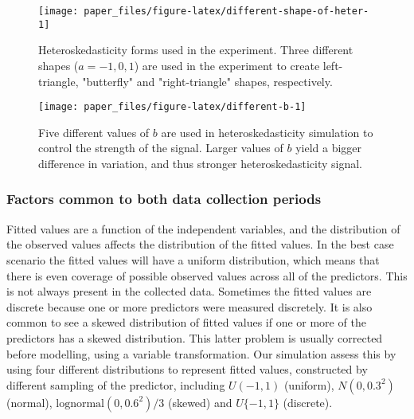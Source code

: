 \documentclass[]{interact}
\theoremstyle{plain}%
\theoremstyle{definition}
\theoremstyle{remark}
\begin{document}
\begin{figure}[!h]

{\centering \texttt{[image: paper\_files/figure-latex/different-shape-of-heter-1]} 

}

\caption{Heteroskedasticity forms used in the experiment. Three different shapes ($a = -1, 0, 1$) are used in the experiment to create left-triangle, "butterfly" and "right-triangle" shapes, respectively.}\label{fig:different-shape-of-heter}
\end{figure}

\begin{figure}[!h]

{\centering \texttt{[image: paper\_files/figure-latex/different-b-1]} 

}

\caption{Five different values of $b$ are used in heteroskedasticity simulation to control the strength of the signal. Larger values of $b$ yield a bigger difference in variation, and thus stronger heteroskedasticity signal.}\label{fig:different-b}
\end{figure}

\hypertarget{factors-common-to-both-data-collection-periods}{%
\subsubsection{Factors common to both data collection
periods}\label{factors-common-to-both-data-collection-periods}}

Fitted values are a function of the independent variables, and the
distribution of the observed values affects the distribution of the
fitted values. In the best case scenario the fitted values will have a
uniform distribution, which means that there is even coverage of
possible observed values across all of the predictors. This is not
always present in the collected data. Sometimes the fitted values are
discrete because one or more predictors were measured discretely. It is
also common to see a skewed distribution of fitted values if one or more
of the predictors has a skewed distribution. This latter problem is
usually corrected before modelling, using a variable transformation. Our
simulation assess this by using four different distributions to
represent fitted values, constructed by different sampling of the
predictor, including \(U(-1, 1)\) (uniform), \(N(0, 0.3^2)\) (normal),
\(\text{lognormal}(0, 0.6^2)/3\) (skewed) and \(U\{-1, 1\}\) (discrete).
\end{document}
